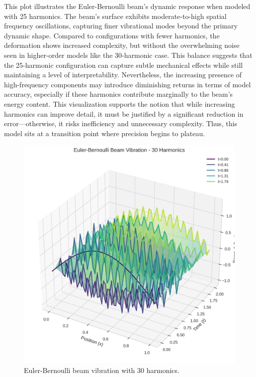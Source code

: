 \documentclass[preprint,12pt]{elsarticle}
\begin{document}
This plot illustrates the Euler-Bernoulli beam's dynamic response when modeled with 25 harmonics. The beam's surface exhibits moderate-to-high spatial frequency oscillations, capturing finer vibrational modes beyond the primary dynamic shape. Compared to configurations with fewer harmonics, the deformation shows increased complexity, but without the overwhelming noise seen in higher-order models like the 30-harmonic case. This balance suggests that the 25-harmonic configuration can capture subtle mechanical effects while still maintaining a level of interpretability. Nevertheless, the increasing presence of high-frequency components may introduce diminishing returns in terms of model accuracy, especially if these harmonics contribute marginally to the beam’s energy content. This visualization supports the notion that while increasing harmonics can improve detail, it must be justified by a significant reduction in error—otherwise, it risks inefficiency and unnecessary complexity. Thus, this model sits at a transition point where precision begins to plateau.

\begin{figure}[t]
    \centering
    \includegraphics[width=0.9\linewidth]{figures/euler_bernoulli_3d_30h.png}
    \caption{Euler-Bernoulli beam vibration with 30 harmonics.}
    \label{fig:euler_30h}
\end{figure}
\end{document}

